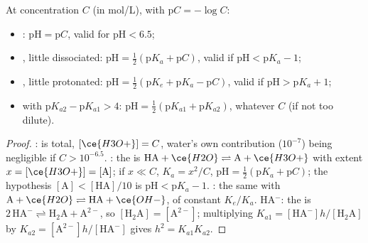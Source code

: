\begin{proposition}\label{prop:b1:predominant-reaction:ph-formulas}
At concentration $C$ (in \unit{mol/L}), with $\mathrm{p}C = -\log C$:
\begin{itemize}
  \item {}: $\mathrm{pH} = \mathrm{p}C$, valid for
        $\mathrm{pH} < 6.5$;
  \item {}, little dissociated: $\mathrm{pH} = \frac12(\mathrm{p}K_a
        + \mathrm{p}C)$, valid if $\mathrm{pH} < \mathrm{p}K_a - 1$;
  \item {}, little protonated: $\mathrm{pH} = \frac12(\mathrm{p}K_e +
        \mathrm{p}K_a - \mathrm{p}C)$, valid if $\mathrm{pH} > \mathrm{p}K_a +
        1$;
  \item {} with $\mathrm{p}K_{a2} - \mathrm{p}K_{a1} > 4$:
        $\mathrm{pH} = \frac12(\mathrm{p}K_{a1} + \mathrm{p}K_{a2})$,
        whatever $C$ (if not too dilute).
\end{itemize}
\end{proposition}

\begin{proof}
:  is total, $[\ce{H3O+}] = C$,
water's own contribution ($10^{-7}$) being negligible if $C > 10^{-6.5}$.
: the  is $\mathrm{HA} + \ce{H2O}
\rightleftharpoons \mathrm{A} + \ce{H3O+}$ with extent $x = [\ce{H3O+}]
= [\mathrm{A}]$; if $x \ll C$, $K_a = x^2/C$, $\mathrm{pH} = \frac12(\mathrm{p}K_a
+ \mathrm{p}C)$; the hypothesis $[\mathrm{A}] < [\mathrm{HA}]/10$ is
$\mathrm{pH} < \mathrm{p}K_a - 1$. : the same with $\mathrm{A} +
\ce{H2O} \rightleftharpoons \mathrm{HA} + \ce{OH-}$, of constant $K_e/K_a$.
 HA$^-$: the  is $2\,\mathrm{HA}^- \rightleftharpoons
\mathrm{H_2A} + \mathrm{A}^{2-}$, so $[\mathrm{H_2A}] = [\mathrm{A}^{2-}]$;
multiplying $K_{a1} = [\mathrm{HA}^-]h/[\mathrm{H_2A}]$ by $K_{a2} =
[\mathrm{A}^{2-}]h/[\mathrm{HA}^-]$ gives $h^2 = K_{a1}K_{a2}$.
\end{proof}

